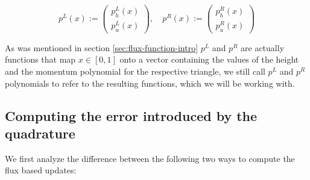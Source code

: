 \documentclass{article}
\begin{document}
\begin{equation*}
  p^L(x) :=
  \begin{pmatrix}
    p^L_h(x) \\ p^L_u(x)
  \end{pmatrix}, \quad
  p^R(x) :=
  \begin{pmatrix}
    p^R_h(x) \\ p^R_u(x)
  \end{pmatrix}
\end{equation*}

As was mentioned in section \ref{sec:flux-function-intro} $p^L$ and $p^R$ are actually functions that map $x \in [0,1]$ onto a vector containing the values of the height and the momentum polynomial for the respective triangle, we still call $p^L$ and $p^R$ polynomials to refer to the resulting functions, which we will be working with.

\subsection{Computing the error introduced by the quadrature}
\label{sec:goal-intro}

We first analyze the difference between the following two ways to compute the flux based updates:
\end{document}
